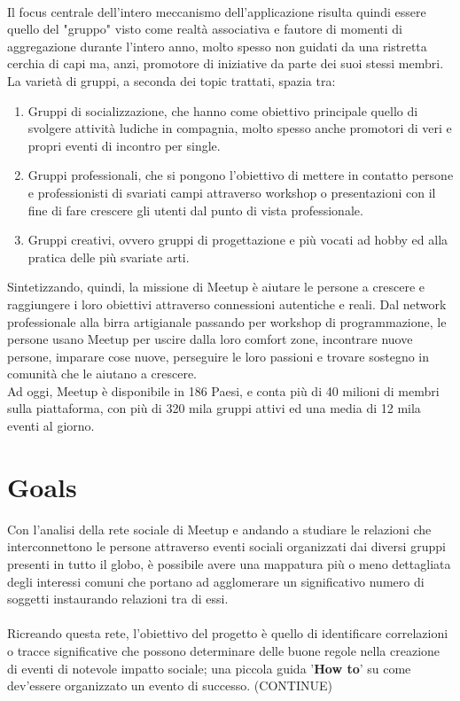 \documentclass[fleqn,10pt]{SelfArx} %
\begin{document}
{\\
Il focus centrale dell'intero meccanismo dell'applicazione risulta quindi essere quello del "gruppo" visto come realtà associativa e fautore di momenti di aggregazione durante l'intero anno, molto spesso non guidati da una ristretta cerchia di capi ma, anzi, promotore di iniziative da parte dei suoi stessi membri. La varietà di gruppi, a seconda dei topic trattati, spazia tra:
\begin{enumerate}
\item Gruppi di socializzazione, che hanno come obiettivo principale quello di svolgere attività ludiche in compagnia, molto spesso anche promotori di veri e propri eventi di incontro per single.
\item Gruppi professionali, che si pongono l'obiettivo di mettere in contatto persone e professionisti di svariati campi attraverso workshop o presentazioni con il fine di fare crescere gli utenti dal punto di vista professionale.
\item Gruppi creativi, ovvero gruppi di progettazione e più vocati ad hobby ed alla pratica delle più svariate arti. \\
\end{enumerate}
Sintetizzando, quindi, la missione di Meetup è aiutare le persone a crescere e raggiungere i loro obiettivi attraverso connessioni autentiche e reali. Dal network professionale alla birra artigianale passando per workshop di programmazione, le persone usano Meetup per uscire dalla loro comfort zone, incontrare nuove persone, imparare cose nuove, perseguire le loro passioni e trovare sostegno in comunità che le aiutano a crescere.\\
Ad oggi, Meetup è disponibile in 186 Paesi, e conta più di 40 milioni di membri sulla piattaforma, con più di 320 mila gruppi attivi ed una media di 12 mila eventi al giorno.
}

\section{Goals}
{\footnotesize
Con l'analisi della rete sociale di Meetup e andando a studiare le relazioni che interconnettono le persone attraverso eventi sociali organizzati dai diversi gruppi presenti in tutto il globo, è possibile avere una mappatura più o meno dettagliata degli interessi comuni che portano ad agglomerare un significativo numero di soggetti instaurando relazioni tra di essi. \\
\\
Ricreando questa rete, l'obiettivo del progetto è quello di identificare correlazioni o tracce significative che possono determinare delle buone regole nella creazione di eventi di notevole impatto sociale; una piccola guida '\textbf{How to}' su come dev'essere organizzato un evento di successo. (CONTINUE)%
}
\end{document}

